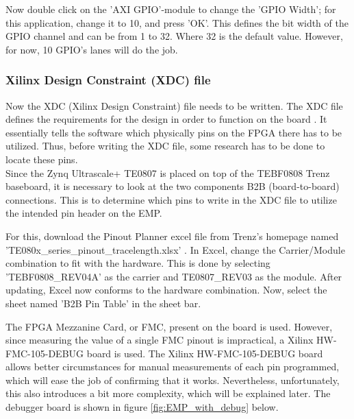 \noindent Now double click on the 'AXI GPIO'-module to change the 'GPIO Width'; for this application, change it to 10, and press 'OK'. This defines the bit width of the GPIO channel and can be from 1 to 32. Where 32 is the default value. However, for now, 10 GPIO's lanes will do the job.

\subsubsection*{Xilinx Design Constraint (XDC) file}
Now the XDC (Xilinx Design Constraint) file needs to be written. The XDC file defines the requirements for the design in order to function on the board \cite{ug903viv24:online}. It essentially tells the software which physically pins on the FPGA there has to be utilized. Thus, before writing the XDC file, some research has to be done to locate these pins.\\

\noindent Since the Zynq Ultrascale+ TE0807 is placed on top of the TEBF0808 Trenz baseboard, it is necessary to look at the two components B2B (board-to-board) connections. This is to determine which pins to write in the XDC file to utilize the intended pin header on the EMP. 

For this, download the Pinout Planner excel file from Trenz's homepage named 'TE080x\_series\_pinout\_tracelength.xlsx' \cite{Download48:online}. In Excel, change the Carrier/Module combination to fit with the hardware. This is done by selecting 'TEBF0808\_REV04A' as the carrier and TE0807\_REV03 as the module. After updating, Excel now conforms to the hardware combination. Now, select the sheet named 'B2B Pin Table' in the sheet bar. \newline 

\noindent The FPGA Mezzanine Card, or FMC, present on the board is used. However, since measuring the value of a single FMC pinout is impractical, a Xilinx HW-FMC-105-DEBUG board is used. The Xilinx HW-FMC-105-DEBUG board allows better circumstances for manual measurements of each pin programmed, which will ease the job of confirming that it works. Nevertheless, unfortunately, this also introduces a bit more complexity, which will be explained later. The debugger board is shown in figure \ref{fig:EMP_with_debug} below.

